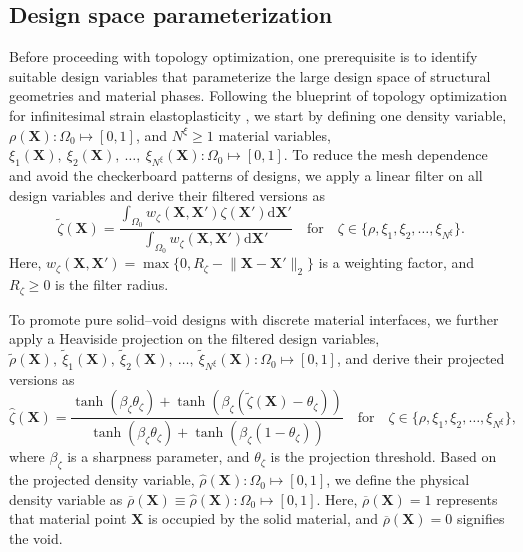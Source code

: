 \documentclass[preprint,11pt]{elsarticle}
\theoremstyle{definition}
\begin{document}
\subsection{Design space parameterization}

Before proceeding with topology optimization, one prerequisite is to identify suitable design variables that parameterize the large design space of structural geometries and material phases. Following the blueprint of topology optimization for infinitesimal strain elastoplasticity \citep{jia_multimaterial_2025}, we start by defining one density variable, $\rho(\mathbf{X}): \Omega_0 \mapsto [0, 1]$, and $N^\xi \geq 1$ material variables, $\xi_1(\mathbf{X}),\ \xi_2(\mathbf{X}),\ \ldots,\ \xi_{N^\xi}(\mathbf{X}): \Omega_0 \mapsto [0, 1]$. To reduce the mesh dependence and avoid the checkerboard patterns of designs, we apply a linear filter \citep{bourdin_filters_2001} on all design variables and derive their filtered versions as
\begin{equation*}
    \widetilde{\zeta}(\mathbf{X}) = \dfrac{\displaystyle \int_{\Omega_0} w_\zeta(\mathbf{X}, \mathbf{X}') \zeta(\mathbf{X}') \text{d} \mathbf{X}'}{\displaystyle \int_{\Omega_0} w_\zeta(\mathbf{X}, \mathbf{X}') \text{d} \mathbf{X}'}
    \quad \text{for} \quad
    \zeta \in \{\rho, \xi_1, \xi_2, \ldots, \xi_{N^\xi}\}.
\end{equation*}
Here, $w_\zeta(\mathbf{X}, \mathbf{X}') = \max \{ 0, R_\zeta-\lVert \mathbf{X}-\mathbf{X}' \rVert_2 \}$ is a weighting factor, and $R_\zeta \geq 0$ is the filter radius. 

To promote pure solid--void designs with discrete material interfaces, we further apply a Heaviside projection \citep{bendsoe_topology_2003} on the filtered design variables, $\widetilde{\rho}(\mathbf{X}),\ \widetilde{\xi}_1(\mathbf{X}),\ \widetilde{\xi}_2(\mathbf{X}),\ \ldots,\ \widetilde{\xi}_{N^\xi}(\mathbf{X}): \Omega_0 \mapsto [0, 1]$, and derive their projected versions as
\begin{equation} \label{Heaviside Projection}
    \widehat{\zeta}(\mathbf{X}) = \dfrac{\tanh(\beta_\zeta \theta_\zeta) + \tanh(\beta_\zeta (\widetilde{\zeta}(\mathbf{X}) - \theta_\zeta))}{\tanh(\beta_\zeta \theta_\zeta) + \tanh(\beta_\zeta (1 - \theta_\zeta))}
    \quad \text{for} \quad
     \zeta \in \{\rho, \xi_1, \xi_2, \ldots, \xi_{N^\xi}\},
\end{equation}
where $\beta_\zeta$ is a sharpness parameter, and $\theta_\zeta$ is the projection threshold. Based on the projected density variable, $\widehat{\rho}(\mathbf{X}): \Omega_0 \mapsto [0, 1]$, we define the physical density variable as $\overline{\rho}(\mathbf{X}) \equiv \widehat{\rho}(\mathbf{X}): \Omega_0 \mapsto [0, 1]$. Here, $\overline{\rho}(\mathbf{X}) = 1$ represents that material point $\mathbf{X}$ is occupied by the solid material, and $\overline{\rho}(\mathbf{X}) = 0$ signifies the void.
\end{document}
